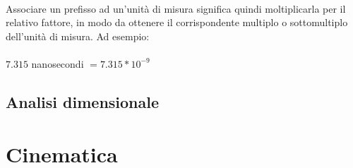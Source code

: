 \documentclass{report}
\begin{document}
\\
Associare un prefisso ad un'unità di misura significa quindi moltiplicarla per il relativo fattore, in modo da ottenere il corrispondente multiplo o sottomultiplo dell'unità di misura. Ad esempio:
\\
\\
$7.315$ nanosecondi $= 7.315 * 10^{-9}$


\section{Analisi dimensionale} %
\label{sec:Analisi dimensionale}



\chapter{Cinematica} %
\label{chap:Cinematica}

\end{document}
